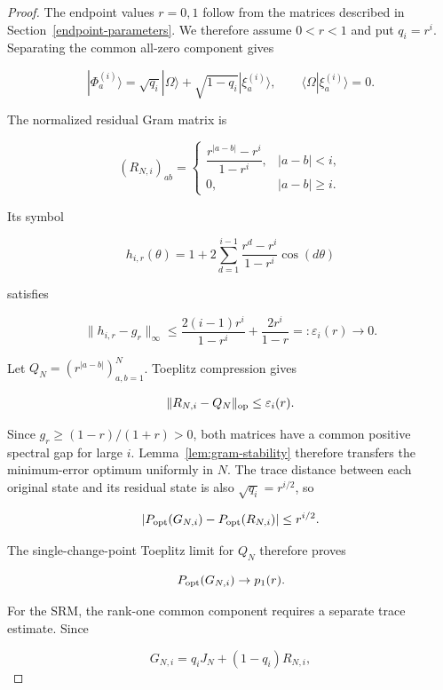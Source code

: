 \begin{proof}
The endpoint values \(r=0,1\) follow from the matrices described in
Section~\ref{endpoint-parameters}. We therefore assume \(0<r<1\) and put
\(q_i=r^i\). Separating the common all-zero component gives

\[
|\Phi_a^{(i)}\rangle
=\sqrt{q_i}|\Omega\rangle
+\sqrt{1-q_i}|\xi_a^{(i)}\rangle,
\qquad \langle\Omega|\xi_a^{(i)}\rangle=0.
\]

The normalized residual Gram matrix is

\begin{equation}\label{eq:residual-gram}
(R_{N,i})_{ab}=
\begin{cases}
\dfrac{r^{|a-b|}-r^i}{1-r^i},&|a-b|<i,\\
0,&|a-b|\ge i.
\end{cases}
\end{equation}

Its symbol

\[
h_{i,r}(\theta)
=1+2\sum_{d=1}^{i-1}\frac{r^d-r^i}{1-r^i}\cos(d\theta)
\]

satisfies

\begin{equation}\label{eq:residual-symbol-convergence}
\|h_{i,r}-g_r\|_\infty
\le\frac{2(i-1)r^i}{1-r^i}+\frac{2r^i}{1-r}
=:\varepsilon_i(r)\longrightarrow0.
\end{equation}

Let \(Q_N=(r^{|a-b|})_{a,b=1}^N\). Toeplitz compression gives

\begin{equation}\label{eq:residual-operator-convergence}
\|R_{N,i}-Q_N\|_{\rm op}\le\varepsilon_i(r).
\end{equation}

Since \(g_r\ge(1-r)/(1+r)>0\), both matrices have a common positive
spectral gap for large \(i\). Lemma~\ref{lem:gram-stability} therefore
transfers the minimum-error optimum uniformly in \(N\). The trace distance
between each original state and its residual state is also
\(\sqrt{q_i}=r^{i/2}\), so

\[
|P_{\rm opt}(G_{N,i})-P_{\rm opt}(R_{N,i})|
\le r^{i/2}.
\]

The single-change-point Toeplitz limit for \(Q_N\) therefore proves

\[
P_{\rm opt}(G_{N,i})\to p_1(r).
\]

For the SRM, the rank-one common component requires a separate trace estimate.
Since

\[
G_{N,i}=q_iJ_N+(1-q_i)R_{N,i},
\]


\end{proof}
